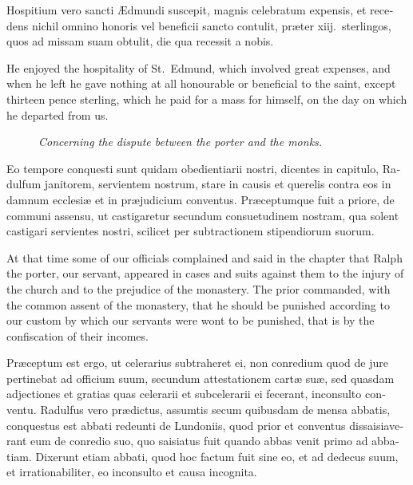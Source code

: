 \documentclass[10pt]{book}
\newcommand{\blockhead}[4][]{
\begin{figure}
\centering
\vspace{#4}
\parbox{2.75cm}{\begin{center}\footnotesize \color{BrickRed} \emph{#2}\\ #1 \end{center}}
\end{figure}
}
\begin{document}
\begin{paracol}{2}
\switchcolumn*

\begin{otherlanguage}{latin}
Hospitium vero sancti \AE{}dmundi suscepit, magnis celebratum expensis, et recedens nichil omnino honoris vel beneficii sancto contulit, pr\ae{}ter xiij.\ sterlingos, quos ad missam suam obtulit, die qua recessit a nobis.
\end{otherlanguage}

\switchcolumn

He enjoyed the hospitality of St.\ Edmund, which involved great expenses, and when he left he gave nothing at all honourable or beneficial to the saint, except thirteen pence sterling, which he paid for a mass for himself, on the day on which he departed from us.

\switchcolumn*

\clearpage

\begin{otherlanguage}{latin}
\blockhead{Concerning the dispute between the porter and the monks.}{4}{-.1cm}
Eo tempore conquesti sunt quidam obedientiarii nostri, dicentes in capitulo, Radulfum janitorem, servientem nostrum, stare in causis et querelis contra eos in damnum ecclesi\ae{} et in pr\ae{}judicium conventus. Pr\ae{}ceptumque fuit a priore, de communi assensu, ut castigaretur secundum consuetudinem nostram, qua solent castigari servientes nostri, scilicet per subtractionem stipendiorum suorum.

\end{otherlanguage}

\switchcolumn

At that time some of our officials complained and said in the chapter that Ralph the porter, our servant, appeared in cases and suits against them to the injury of the church and to the prejudice of the monastery. The prior commanded, with the common assent of the monastery, that he should be punished according to our custom by which our servants were wont to be punished, that is by the confiscation of their incomes.

\switchcolumn*

\begin{otherlanguage}{latin}
Pr\ae{}ceptum est ergo, ut celerarius subtraheret ei, non conredium quod de jure pertinebat ad officium suum, secundum attestationem cart\ae{} su\ae{}, sed quasdam adjectiones et gratias quas celerarii et subcelerarii ei fecerant, inconsulto conventu. Radulfus vero pr\ae{}dictus, assumtis secum quibusdam de mensa abbatis, conquestus est abbati redeunti de Lundoniis, quod prior et conventus dissaisiaverant eum de conredio suo, quo saisiatus fuit quando abbas venit primo ad abbatiam. Dixerunt etiam abbati, quod hoc factum fuit sine eo, et ad dedecus suum, et irrationabiliter, eo inconsulto et causa incognita. 
\end{otherlanguage}


\end{paracol}
\end{document}

